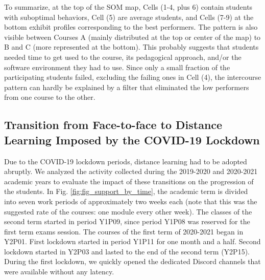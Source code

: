 \documentclass{aims}
\theoremstyle{definition}
\begin{document}
To summarize, at the top of the SOM map, Cells (1-4, plus 6) contain
students with suboptimal behaviors, Cell (5) are average students, and
Cells (7-9) at the bottom exhibit profiles corresponding to the best
performers. The pattern is also visible between Courses A (mainly
distributed at the top or center of the map) to B and C (more
represented at the bottom). This probably suggests that students needed
time to get used to the course, its pedagogical approach, and/or the
software environment they had to use. Since only a small fraction of the
participating students failed, excluding the failing ones in Cell (4),
the intercourse pattern can hardly be explained by a filter that
eliminated the low performers from one course to the other.

\hypertarget{transition-from-face-to-face-to-distance-learning-imposed-by-the-covid-19-lockdown-1}{%
\subsection{Transition from Face-to-face to Distance Learning Imposed by
the COVID-19
Lockdown}\label{transition-from-face-to-face-to-distance-learning-imposed-by-the-covid-19-lockdown-1}}

Due to the COVID-19 lockdown periods, distance learning had to be
adopted abruptly. We analyzed the activity collected during the
2019-2020 and 2020-2021 academic years to evaluate the impact of these
transitions on the progression of the students. In Fig.
\ref{fig:fig_support_by_time}, the academic term is divided into seven
work periods of approximately two weeks each (note that this was the
suggested rate of the courses: one module every other week). The classes
of the second term started in period Y1P09, since period Y1P08 was
reserved for the first term exams session. The courses of the first term
of 2020-2021 began in Y2P01. First lockdown started in period Y1P11 for
one month and a half. Second lockdown started in Y2P03 and lasted to the
end of the second term (Y2P15). During the first lockdown, we quickly
opened the dedicated Discord channels that were available without any
latency.
\end{document}

